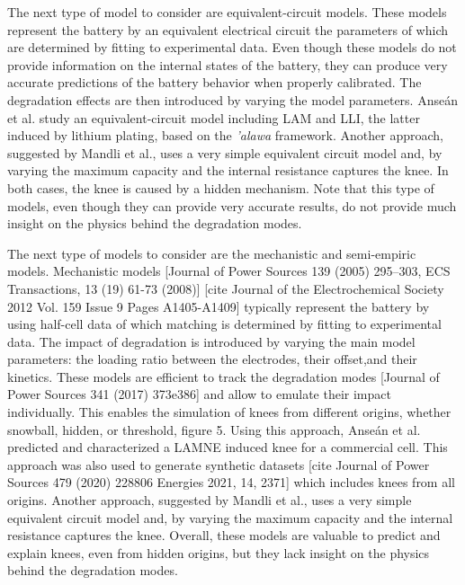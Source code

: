 \documentclass[journal=jpclcd,manuscript=article]{achemso}
\begin{document}
The next type of model to consider are equivalent-circuit models. These models represent the battery by an equivalent electrical circuit the parameters of which are determined by fitting to experimental data. Even though these models do not provide information on the internal states of the battery, they can produce very accurate predictions of the battery behavior when properly calibrated. The degradation effects are then introduced by varying the model parameters. Anse\'an et al. \cite{ansean_operando_2017} study an equivalent-circuit model including LAM and LLI, the latter induced by lithium plating, based on the \emph{'alawa} framework\cite{dubarry_synthesize_2012}. Another approach, suggested by Mandli et al.,\cite{mandli_analysis_2019} uses a very simple equivalent circuit model and, by varying the maximum capacity and the internal resistance captures the knee. In both cases, the knee is caused by a hidden mechanism. Note that this type of models, even though they can provide very accurate results, do not provide much insight on the physics behind the degradation modes.

The next type of models to consider are the mechanistic and semi-empiric models. Mechanistic models [Journal of Power Sources 139 (2005) 295–303,  ECS Transactions, 13 (19) 61-73 (2008)] \cite{dubarry_synthesize_2012} [cite Journal of the Electrochemical Society  2012 Vol. 159 Issue 9 Pages A1405-A1409] typically represent the battery by using half-cell data of which matching is determined by fitting to experimental data. The impact of degradation is introduced by varying the main model parameters: the loading ratio between the electrodes, their offset,and their kinetics. These models are efficient to track the degradation modes \cite{dubarry_synthesize_2012}  [Journal of Power Sources 341 (2017) 373e386] and allow to emulate their impact individually. This enables the simulation of knees from different origins, whether snowball, hidden, or threshold, figure 5. Using this approach, Anse\'an et al. \cite{ansean_operando_2017} predicted and characterized a LAMNE induced knee for a commercial cell. This approach was also used to generate synthetic datasets [cite Journal of Power Sources 479 (2020) 228806 Energies 2021, 14, 2371] which includes knees from all origins. Another approach, suggested by Mandli et al.,\cite{mandli_analysis_2019} uses a very simple equivalent circuit model and, by varying the maximum capacity and the internal resistance captures the knee. Overall, these models are valuable to predict and explain knees, even from hidden origins, but they lack insight on the physics behind the degradation modes.
\end{document}

